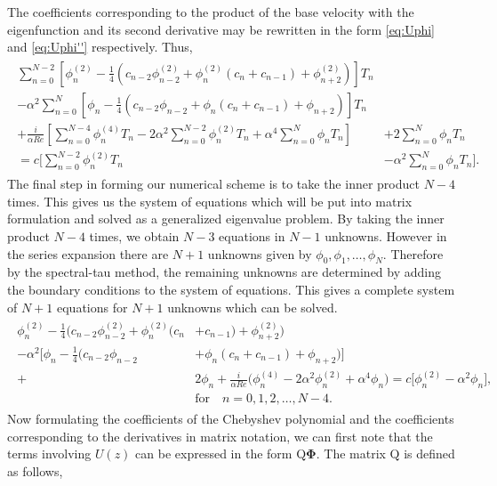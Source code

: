 \documentclass[a4paper, 12pt, twoside, openright]{article}
\numberwithin{equation}{section}
\begin{document}
The coefficients corresponding to the product of the base velocity with the eigenfunction and its second derivative may be rewritten in the form \eqref{eq:Uphi} and \eqref{eq:Uphi''} respectively. Thus,  
\begin{align}
\begin{split}
\sum_{n=0}^{N-2} \left[\phi_n^{(2)} - \frac{1}{4}\left(c_{n-2}\phi_{n-2}^{(2)}+\phi_n^{(2)}\left(c_n + c_{n-1}\right) +\phi_{n+2}^{(2)}\right) \right]T_n& \\ - \alpha^2\sum_{n=0}^{N} \left[\phi_n - \frac{1}{4}\left(c_{n-2}\phi_{n-2}+\phi_n\left(c_n + c_{n-1}\right) +\phi_{n+2}\right) \right]T_n \\+ \frac{i}{\alpha Re}\left[\sum_{n=0}^{N-4}\phi_n^{(4)} T_n - 2\alpha^2\sum_{n=0}^{N-2}\phi_n^{(2)} T_n + \alpha^4\sum_{n=0}^{N}\phi_n T_n \right]& + 2\sum_{n=0}^{N}\phi_n T_n \\= c\Biggl[\sum_{n=0}^{N-2}\phi_n^{(2)} T_n &- \alpha^2\sum_{n=0}^{N}\phi_n T_n \Biggr].  
\end{split}
\end{align}
The final step in forming our numerical scheme is to take the inner product $N-4$ times. This gives us the system of equations which will be put into matrix formulation and solved as a generalized eigenvalue problem. By taking the inner product $N-4$ times, we obtain $N-3$ equations in $N-1$ unknowns. However in the series expansion there are $N+1$ unknowns given by $\phi_0,\phi_1,\dots,\phi_N$. Therefore by the spectral-tau method, the remaining unknowns are determined by adding the boundary conditions to the system of equations. This gives a complete system of $N+1$ equations for $N+1$ unknowns which can be solved. 
\begin{align}
\begin{split}
\phi_n^{(2)} - \frac{1}{4}\bigl(c_{n-2}\phi_{n-2}^{(2)}+\phi_n^{(2)}(c_n& + c_{n-1})+\phi_{n+2}^{(2)}\bigr) \\ - \alpha^2\bigl[\phi_n - \frac{1}{4}\bigl(c_{n-2}\phi_{n-2}&+\phi_n(c_n + c_{n-1}) +\phi_{n+2}\bigr) \bigr]\\+ &2\phi_n + \frac{i}{\alpha Re}\bigl(\phi_n^{(4)}-2\alpha^2\phi_n^{(2)}+ \alpha^4\phi_n  \bigr) = c\bigl[\phi_n^{(2)} - \alpha^2 \phi_n\bigr], \\
&\text{for} \quad n=0,1,2,\dots, N-4. \label{eq:systemforcoeffs}
\end{split}
\end{align}
Now formulating the coefficients of the Chebyshev polynomial and the coefficients corresponding to the derivatives in matrix notation, we can first note that the terms involving $U(z)$ can be expressed in the form $\mathrm{Q}\mathbf{\Phi}$. The matrix $\mathrm{Q}$ is defined as follows,
\end{document}

